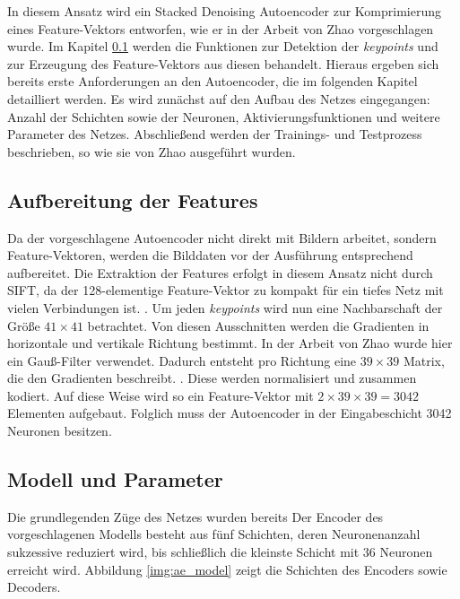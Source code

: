 In diesem Ansatz wird ein Stacked Denoising Autoencoder zur Komprimierung eines Feature-Vektors entworfen, wie er in der Arbeit von Zhao \cite{aed2016} vorgeschlagen wurde. Im Kapitel \ref{AufbereitungFeatures} werden die Funktionen zur Detektion der \textit{keypoints} und zur Erzeugung des Feature-Vektors aus diesen behandelt. Hieraus ergeben sich bereits erste Anforderungen an den Autoencoder, die im folgenden Kapitel detailliert werden. Es wird zunächst auf den Aufbau des Netzes eingegangen: Anzahl der Schichten sowie der Neuronen, Aktivierungsfunktionen und weitere Parameter des Netzes. Abschließend werden der Trainings- und Testprozess beschrieben, so wie sie von Zhao ausgeführt wurden.

\subsection{Aufbereitung der Features}
\label{AufbereitungFeatures}

Da der vorgeschlagene Autoencoder nicht direkt mit Bildern arbeitet, sondern Feature-Vektoren, werden die Bilddaten vor der Ausführung entsprechend aufbereitet. Die Extraktion der Features erfolgt in diesem Ansatz nicht durch SIFT, da der 128-elementige Feature-Vektor zu kompakt für ein tiefes Netz mit vielen Verbindungen ist. . Um jeden \textit{keypoints} wird nun eine Nachbarschaft der Größe $41 \times 41$ betrachtet. Von diesen Ausschnitten werden die Gradienten in horizontale und vertikale Richtung bestimmt. In der Arbeit von Zhao wurde hier ein Gauß-Filter verwendet. Dadurch entsteht pro Richtung eine $39 \times 39$ Matrix, die den Gradienten beschreibt. . Diese werden normalisiert und zusammen kodiert. Auf diese Weise wird so ein Feature-Vektor mit $2 \times 39 \times 39 = 3042$ Elementen aufgebaut. Folglich muss der Autoencoder in der Eingabeschicht 3042 Neuronen besitzen. 

\subsection{Modell und Parameter}

Die grundlegenden Züge des Netzes wurden bereits Der Encoder des vorgeschlagenen Modells besteht aus fünf Schichten, deren Neuronenanzahl sukzessive reduziert wird, bis schließlich die kleinste Schicht mit 36 Neuronen erreicht wird. Abbildung \ref{img:ae_model} zeigt die Schichten des Encoders sowie Decoders. 


